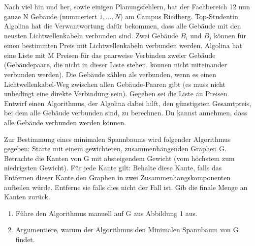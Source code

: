 \documentclass{uebung_cs}
\begin{document}
\begin{aufgabe}
	Nach viel hin und her, sowie einigen Planungsfehlern, hat der Fachbereich 12 nun ganze N Gebäude (nummeriert $1,\ldots , N$) am Campus Riedberg.
	Top-Studentin Algolina hat die Verwantwortung dafür bekommen, dass alle Gebäude mit den neusten Lichtwellenkabeln verbunden sind.
	Zwei Gebäude $B_i$ und $B_j$ können für einen bestimmten Preis mit Lichtwellenkabeln verbunden werden.
	Algolina hat eine Liste mit M Preisen für das paarweise Verbinden zweier Gebäude (Gebäudepaare, die nicht in dieser Liste stehen, können nicht miteinander verbunden werden).
	Die Gebäude zählen als verbunden, wenn es einen Lichtwellenkabel-Weg zwischen allen Gebäude-Paaren gibt (es muss nicht unbedingt eine direkte Verbindung sein).
	Gegeben sei die Liste an Preisen.
	Entwirf einen Algorithmus, der Algolina dabei hilft, den günstigsten Gesamtpreis, bei dem alle Gebäude verbunden sind, zu berechnen.
	Du kannst annehmen, dass alle Gebäude verbunden werden können. 
\end{aufgabe}

\begin{aufgabe}
	Zur Bestimmung eines minimalen Spannbaums wird folgender Algorithmus gegeben: Starte mit einem gewichteten, zusammenhängenden Graphen G. Betrachte die Kanten von G mit absteigendem Gewicht (vom höchstem zum niedrigsten Gewicht).
	Für jede Kante gilt: Behalte diese Kante, falls das Entfernen dieser Kante den Graphen in zwei Zusammenhangskomponenten aufteilen würde. Entferne sie falls dies nicht der Fall ist.
	Gib die finale Menge an Kanten zurück.
	\begin{enumerate}
		\item Führe den Algorithmus manuell auf G aus Abbildung 1 aus.
		\item Argumentiere, warum der Algorithmus den Minimalen Spannbaum von G findet.
	\end{enumerate}
\end{aufgabe}
\end{document}
